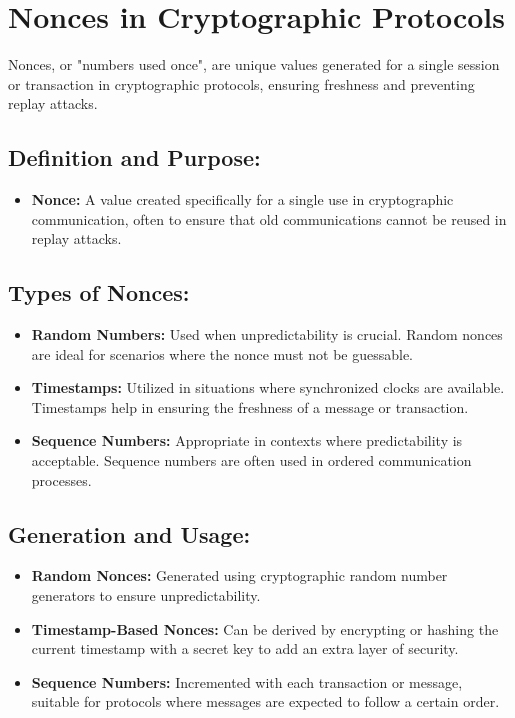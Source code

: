 \documentclass[12pt]{article}
\begin{document}
\section*{Nonces in Cryptographic Protocols}

Nonces, or "numbers used once", are unique values generated for a single session or transaction in cryptographic protocols, ensuring freshness and preventing replay attacks.

\subsection*{Definition and Purpose:}
\begin{itemize}
    \item \textbf{Nonce:} A value created specifically for a single use in cryptographic communication, often to ensure that old communications cannot be reused in replay attacks.
\end{itemize}

\subsection*{Types of Nonces:}
\begin{itemize}
    \item \textbf{Random Numbers:} Used when unpredictability is crucial. Random nonces are ideal for scenarios where the nonce must not be guessable.
    \item \textbf{Timestamps:} Utilized in situations where synchronized clocks are available. Timestamps help in ensuring the freshness of a message or transaction.
    \item \textbf{Sequence Numbers:} Appropriate in contexts where predictability is acceptable. Sequence numbers are often used in ordered communication processes.
\end{itemize}

\subsection*{Generation and Usage:}
\begin{itemize}
    \item \textbf{Random Nonces:} Generated using cryptographic random number generators to ensure unpredictability.
    \item \textbf{Timestamp-Based Nonces:} Can be derived by encrypting or hashing the current timestamp with a secret key to add an extra layer of security.
    \item \textbf{Sequence Numbers:} Incremented with each transaction or message, suitable for protocols where messages are expected to follow a certain order.
\end{itemize}
\end{document}
